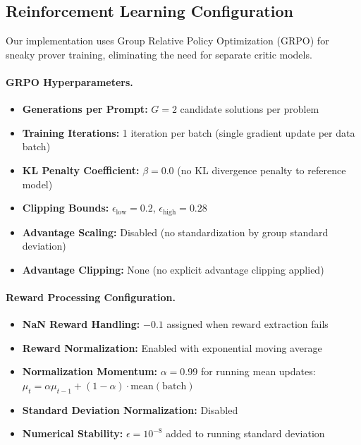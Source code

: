 \subsection{Reinforcement Learning Configuration}
\label{sec:rl_config}

Our implementation uses Group Relative Policy Optimization (GRPO) \citep{shao2024deepseek} for sneaky prover training, eliminating the need for separate critic models.

\paragraph{GRPO Hyperparameters.}
\begin{itemize}
    \item \textbf{Generations per Prompt:} $G = 2$ candidate solutions per problem
    \item \textbf{Training Iterations:} 1 iteration per batch (single gradient update per data batch)
    \item \textbf{KL Penalty Coefficient:} $\beta = 0.0$ (no KL divergence penalty to reference model)
    \item \textbf{Clipping Bounds:} $\epsilon_{\text{low}} = 0.2$, $\epsilon_{\text{high}} = 0.28$
    \item \textbf{Advantage Scaling:} Disabled (no standardization by group standard deviation)
    \item \textbf{Advantage Clipping:} None (no explicit advantage clipping applied)
\end{itemize}

\paragraph{Reward Processing Configuration.}
\begin{itemize}
    \item \textbf{NaN Reward Handling:} $-0.1$ assigned when reward extraction fails
    \item \textbf{Reward Normalization:} Enabled with exponential moving average
    \item \textbf{Normalization Momentum:} $\alpha = 0.99$ for running mean updates: $\mu_t = \alpha \mu_{t-1} + (1-\alpha) \cdot \text{mean}(\text{batch})$
    \item \textbf{Standard Deviation Normalization:} Disabled
    \item \textbf{Numerical Stability:} $\epsilon = 10^{-8}$ added to running standard deviation
\end{itemize}

